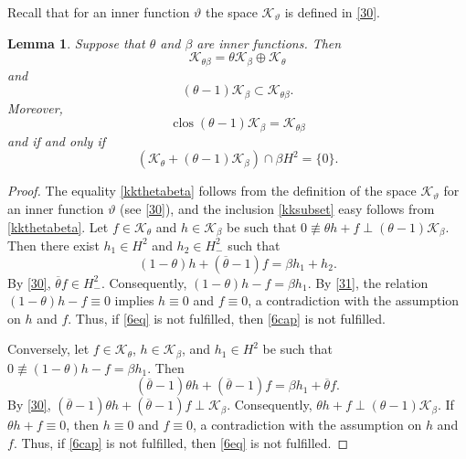 \documentclass[a4paper,oneside,11pt]{amsart}
\numberwithin{equation}{section}
\theoremstyle{plain}
\newtheorem{lemma}[theorem]{Lemma}
\theoremstyle{definition}
\begin{document}
Recall that for an inner function $\vartheta$ the space $\mathcal K_\vartheta$ is defined in \eqref{30}.

\begin{lemma}\label{lemthetabetadense} Suppose that $\theta$ and $\beta$ are inner functions. Then 
\begin{equation}\label{kkthetabeta} \mathcal K_{\theta\beta}=\theta \mathcal K_\beta\oplus\mathcal K_\theta\end{equation} and 
\begin{equation}\label{kksubset} (\theta-1)\mathcal K_\beta\subset \mathcal K_{\theta\beta}.\end{equation}
Moreover, 
\begin{equation} \label{6eq} \operatorname{clos}(\theta-1)\mathcal K_\beta= \mathcal K_{\theta\beta}\end{equation}
and if and only if 
\begin{equation} \label{6cap}(\mathcal K_\theta+(\theta-1)\mathcal K_\beta)\cap \beta H^2=\{0\}.\end{equation}
\end{lemma}

\begin{proof} The equality \eqref{kkthetabeta} follows from the definition of the space $\mathcal K_\vartheta$ for an inner function $\vartheta$ (see \eqref{30}), 
and the inclusion \eqref{kksubset}  easy follows from \eqref{kkthetabeta}. Let $f\in \mathcal K_\theta$ and $h\in\mathcal K_\beta$ be such that 
$0\not\equiv\theta h+f\perp (\theta-1)\mathcal K_\beta$. Then there exist $h_1\in H^2$ and $h_2\in H^2_-$ such that 
\begin{equation*} (1-\theta)h+(\overline\theta-1)f=\beta h_1+h_2.\end{equation*}
By \eqref{30}, $\overline\theta f\in H^2_-$. Consequently, $(1-\theta)h-f=\beta h_1$. By \eqref{31},
 the relation $(1-\theta)h-f\equiv 0$ implies
$h\equiv 0$ and $f\equiv 0$, a contradiction with the assumption on $h$ and $f$. Thus, if \eqref{6eq} is not fulfilled, then \eqref{6cap} 
is not fulfilled.

Conversely, let $f\in \mathcal K_\theta$,  $h\in\mathcal K_\beta$, and  $h_1\in H^2$ be such that $0\not\equiv(1-\theta)h-f=\beta h_1$. 
Then \begin{equation*} (\overline\theta-1)\theta h + (\overline\theta-1)f=\beta h_1+\overline\theta f.\end{equation*}
By \eqref{30}, $(\overline\theta-1)\theta h + (\overline\theta-1)f\perp\mathcal K_\beta$. Consequently, 
$\theta h+f\perp (\theta-1)\mathcal K_\beta$. If $\theta h+f\equiv 0$, then $h\equiv 0$ and $f\equiv 0$, 
 a contradiction with the assumption on $h$ and $f$. Thus, if \eqref{6cap} is not fulfilled, then \eqref{6eq} 
is not fulfilled.
\end{proof}
\end{document}

